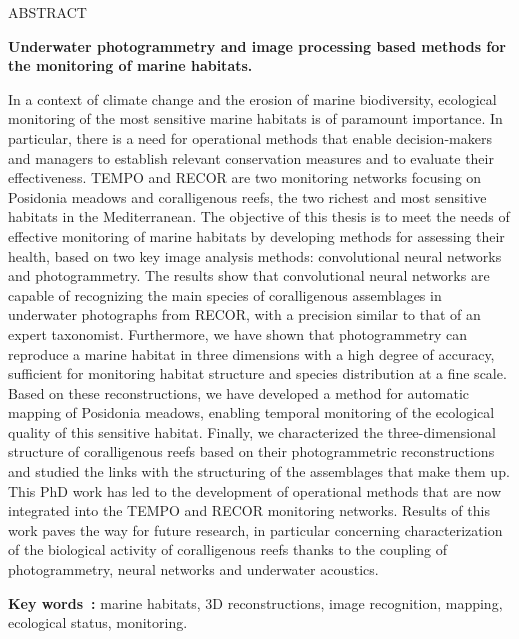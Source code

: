 {\centerline {{\sffamily \Large ABSTRACT}}}

\noindent\textbf{Underwater photogrammetry and image processing based methods for the monitoring of marine habitats.}

\noindent In a context of climate change and the erosion of marine biodiversity, ecological monitoring of the most sensitive marine habitats is of paramount importance. In particular, there is a need for operational methods that enable decision-makers and managers to establish relevant conservation measures and to evaluate their effectiveness. TEMPO and RECOR are two monitoring networks focusing on Posidonia meadows and coralligenous reefs, the two richest and most sensitive habitats in the Mediterranean. The objective of this thesis is to meet the needs of effective monitoring of marine habitats by developing methods for assessing their health, based on two key image analysis methods: convolutional neural networks and photogrammetry. The results show that convolutional neural networks are capable of recognizing the main species of coralligenous assemblages in underwater photographs from RECOR, with a precision similar to that of an expert taxonomist. Furthermore, we have shown that photogrammetry can reproduce a marine habitat in three dimensions with a high degree of accuracy, sufficient for monitoring habitat structure and species distribution at a fine scale. Based on these reconstructions, we have developed a method for automatic mapping of Posidonia meadows, enabling temporal monitoring of the ecological quality of this sensitive habitat. Finally, we characterized the three-dimensional structure of coralligenous reefs based on their photogrammetric reconstructions and studied the links with the structuring of the assemblages that make them up. This PhD work has led to the development of operational methods that are now integrated into the TEMPO and RECOR monitoring networks. Results of this work paves the way for future research, in particular concerning characterization of the biological activity of coralligenous reefs thanks to the coupling of photogrammetry, neural networks and underwater acoustics.

\noindent\textbf{Key words~: }{marine habitats, 3D reconstructions, image recognition, mapping, ecological status, monitoring}.
